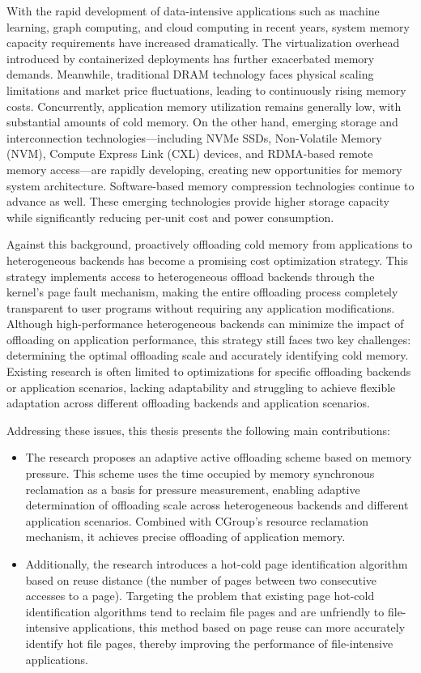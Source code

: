 \begin{englishabstract}

With the rapid development of data-intensive applications such as machine learning, graph computing, and cloud computing in recent years, system memory capacity requirements have increased dramatically. The virtualization overhead introduced by containerized deployments has further exacerbated memory demands. Meanwhile, traditional DRAM technology faces physical scaling limitations and market price fluctuations, leading to continuously rising memory costs. Concurrently, application memory utilization remains generally low, with substantial amounts of cold memory. On the other hand, emerging storage and interconnection technologies—including NVMe SSDs, Non-Volatile Memory (NVM), Compute Express Link (CXL) devices, and RDMA-based remote memory access—are rapidly developing, creating new opportunities for memory system architecture. Software-based memory compression technologies continue to advance as well. These emerging technologies provide higher storage capacity while significantly reducing per-unit cost and power consumption.

Against this background, proactively offloading cold memory from applications to heterogeneous backends has become a promising cost optimization strategy. This strategy implements access to heterogeneous offload backends through the kernel's page fault mechanism, making the entire offloading process completely transparent to user programs without requiring any application modifications. Although high-performance heterogeneous backends can minimize the impact of offloading on application performance, this strategy still faces two key challenges: determining the optimal offloading scale and accurately identifying cold memory. Existing research is often limited to optimizations for specific offloading backends or application scenarios, lacking adaptability and struggling to achieve flexible adaptation across different offloading backends and application scenarios.
    
Addressing these issues, this thesis presents the following main contributions:
\begin{itemize}
    \item The research proposes an adaptive active offloading scheme based on memory pressure. This scheme uses the time occupied by memory synchronous reclamation as a basis for pressure measurement, enabling adaptive determination of offloading scale across heterogeneous backends and different application scenarios. Combined with CGroup's resource reclamation mechanism, it achieves precise offloading of application memory.
    \item Additionally, the research introduces a hot-cold page identification algorithm based on reuse distance (the number of pages between two consecutive accesses to a page). Targeting the problem that existing page hot-cold identification algorithms tend to reclaim file pages and are unfriendly to file-intensive applications, this method based on page reuse can more accurately identify hot file pages, thereby improving the performance of file-intensive applications.
\end{itemize}
    

\end{englishabstract}
